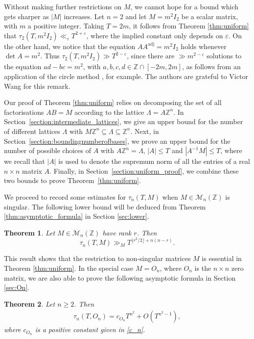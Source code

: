 \documentclass[11pt,reqno]{amsart}
\newtheorem{thm}{Theorem}
\theoremstyle{definition}
\theoremstyle{remark}
\numberwithin{equation}{section}
\numberwithin{thm}{section}
\numberwithin{table}{section}
\def \Z {{\mathbb Z}}
\newcommand{\ZZ}{\mathbb Z}
\newcommand{\adj}{\mathrm{adj}}
\begin{document}
Without making further restrictions on $M$, we cannot hope for a 
bound which gets sharper as $|M|$ increases.  
Let  $n=2$ and let $M= m^2 I_2$ be a scalar matrix,  with $m$ a positive integer. Taking $T=2m$, it follows from Theorem \ref{thm:uniform} that 
$ \tau_2(T,m^2I_2) \ll_{\varepsilon} T^{ 2 +\varepsilon}$, where the implied constant only depends on $\varepsilon$. On the other hand, we notice that the equation $A A^\adj = m^2I_2$ holds whenever $\det A = m^2$. 
Thus $ \tau_2(T,m^2I_2)\gg T^{2-\varepsilon}$, since there  are $\gg m^{2-\varepsilon}$ solutions to the equation $ad-bc = m^2$,  with $a,b,c,d \in \ZZ\cap [-2m,2m]$, as follows from an application of the circle method 
\cite[Theorem~4]{HB}, for example. 
The authors are grateful to Victor Wang for this remark. 


Our proof of Theorem \ref{thm:uniform} relies on  decomposing the set of all factorisations $AB =M$ according to the lattice $\mathsf\Lambda=A\Z^n$.
In Section~\ref{section:intermediate_lattices}, we give an upper bound for the number of different lattices $\mathsf\Lambda$ with $M\Z^n \subseteq \mathsf\Lambda \subseteq \Z^n$. Next, in  Section~\ref{section:boundingnumberofbases}, we prove an upper bound for the number of possible choices of $A$ with $A\Z^n = \mathsf\Lambda$, $|A|\le T$ and  $|A^{-1}M|\le T$,
where we recall that 
$|A|$ is used to denote the supremum norm of all the entries of a real $n\times n$ matrix $A$.
Finally, in Section~\ref{section:uniform_proof}, we combine these two bounds to prove Theorem~\ref{thm:uniform}. 

\medskip

We proceed to record some estimates for  
$\tau_n(T,M)$ when  $M\in \mathcal{M}_n(\ZZ)$ is  singular. The following lower bound  will be deduced from Theorem \ref{thm:asymptotic_formula} in Section \ref{sec:lower}.

  \begin{thm}\label{thm:lowerboundrankr}
  Let $M \in \mathcal{M}_n(\Z)$ have  rank $r$. Then
    \[
    \tau_{n}(T,M) \gg_M T^{\lfloor r^2/2 \rfloor + n(n-r)}.
    \]
    \end{thm}

This result shows that the restriction 
to non-singular matrices $M$
 is essential in Theorem \ref{thm:uniform}. In the special case $M=O_n$, 
where $O_n$ is the $n\times n$ zero matrix, we are also able to prove 
the following asymptotic formula  in Section \ref{sec:On}.

\begin{thm}\label{thm:factoring_zero}
    Let $n \ge 2$. Then
    \begin{align*}
       \tau_n(T,O_n) = c_{O_n} T^{n^2} +O(T^{n^2-1}),
    \end{align*}
    where $c_{O_n}$
    is a positive constant given in \eqref{c_n}.
\end{thm}
\end{document}
